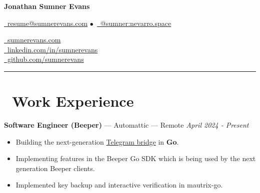 \documentclass[10pt,letterpaper]{article}
\begin{document}
\begin{minipage}[b][][b]{0.5\linewidth}
    {\huge\textbf{Jonathan Sumner Evans}}

    \vspace{5pt}
    \href{mailto:resume@sumnerevans.com}{\faEnvelope\ resume@sumnerevans.com}
    $\bullet$\ \href{https://matrix.to/#/@sumner:nevarro.space}{\faMatrixOrg\ @sumner:nevarro.space}
\end{minipage}\hfill
\begin{minipage}[b][][b]{0.4375\linewidth}
    \href{https://sumnerevans.com}{\faGlobe\ sumnerevans.com} \\
    \href{https://www.linkedin.com/in/sumnerevans}{\faLinkedin\ linkedin.com/in/sumnerevans} \\
    \href{https://github.com/sumnerevans}{\faGithub\ github.com/sumnerevans}
\end{minipage}
\rule{\textwidth}{0.5pt}

\section*{\faBriefcase\ Work Experience}
{\fontsize{11}{0}
\textbf{Software Engineer (Beeper)} --- Automattic --- Remote}
\hfill \textit{April 2024 - Present}
\begin{itemize}
    \item Building the next-generation
        \href{https://github.com/mautrix/telegramgo}{Telegram bridge}
        in \textbf{Go}.
    \item Implementing features in the Beeper Go SDK which is being used by the
        next generation Beeper clients.
    \item Implemented key backup and interactive verification in mautrix-go.
\end{itemize}
\end{document}
